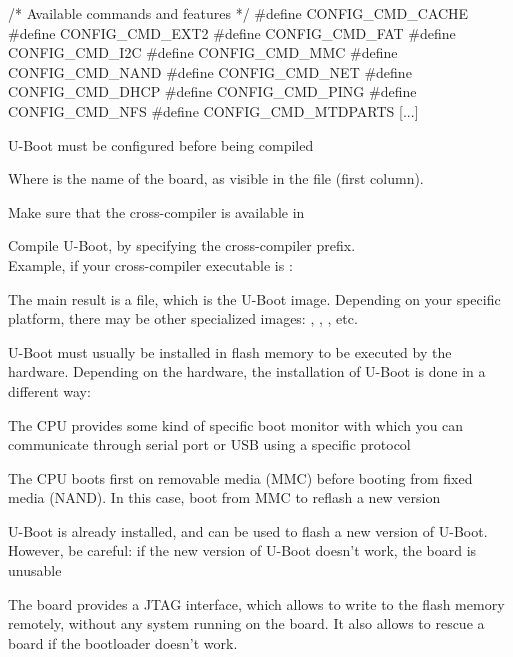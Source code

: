 \starttyping
/* Available commands and features */
#define CONFIG_CMD_CACHE
#define CONFIG_CMD_EXT2
#define CONFIG_CMD_FAT
#define CONFIG_CMD_I2C
#define CONFIG_CMD_MMC
#define CONFIG_CMD_NAND
#define CONFIG_CMD_NET
#define CONFIG_CMD_DHCP
#define CONFIG_CMD_PING
#define CONFIG_CMD_NFS
#define CONFIG_CMD_MTDPARTS
[...]
\stoptyping

  \startitemize
  \item U-Boot must be configured before being compiled
    \startitemize
    \item {}
    \item Where  is the name of the board, as visible
      in the  file (first column).
    \stopitemize
  \item Make sure that the cross-compiler is available in 
  \item Compile U-Boot, by specifying the cross-compiler prefix.\\
    Example, if your cross-compiler executable is :\\
  \item The main result is a  file, which is the
    U-Boot image. Depending on your specific platform, there may be
    other specialized images: , ,
    , etc.
  \stopitemize

  \startitemize
  \item U-Boot must usually be installed in flash memory to be
    executed by the hardware. Depending on the hardware, the
    installation of U-Boot is done in a different way:
    \startitemize
    \item The CPU provides some kind of specific boot monitor with
      which you can communicate through serial port or USB using a
      specific protocol
    \item The CPU boots first on removable media (MMC) before booting
      from fixed media (NAND). In this case, boot from MMC to reflash
      a new version
    \item U-Boot is already installed, and can be used to flash a new
      version of U-Boot. However, be careful: if the new version of
      U-Boot doesn't work, the board is unusable
    \item The board provides a JTAG interface, which allows to write
      to the flash memory remotely, without any system running on the
      board. It also allows to rescue a board if the bootloader
      doesn't work.
    \stopitemize
  \stopitemize

